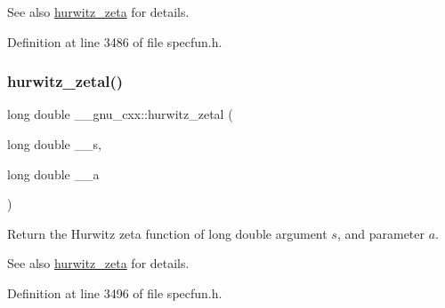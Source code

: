 \begin{DoxySeeAlso}{See also}
\hyperlink{group__gnu__math__spec__func_ga7b167ce1c8d9aa6aad40fc83a95733bd}{hurwitz\+\_\+zeta} for details. 
\end{DoxySeeAlso}


Definition at line 3486 of file specfun.\+h.

\mbox{\label{group__gnu__math__spec__func_gad8f2cfc7e198755968bae35d46b49d5a}} 
\subsubsection{\texorpdfstring{hurwitz\+\_\+zetal()}{hurwitz\_zetal()}}
{\footnotesize\ttfamily long double \+\_\+\+\_\+gnu\+\_\+cxx\+::hurwitz\+\_\+zetal (\begin{DoxyParamCaption}\item[{long double}]{\+\_\+\+\_\+s,  }\item[{long double}]{\+\_\+\+\_\+a }\end{DoxyParamCaption})\hspace{0.3cm}{\ttfamily [inline]}}

Return the Hurwitz zeta function of {\ttfamily long double} argument $ s $, and parameter $ a $.

\begin{DoxySeeAlso}{See also}
\hyperlink{group__gnu__math__spec__func_ga7b167ce1c8d9aa6aad40fc83a95733bd}{hurwitz\+\_\+zeta} for details. 
\end{DoxySeeAlso}


Definition at line 3496 of file specfun.\+h.

\mbox{\label{group__gnu__math__spec__func_ga374198e4076f9e23f3878ca3af70e6da}} 
